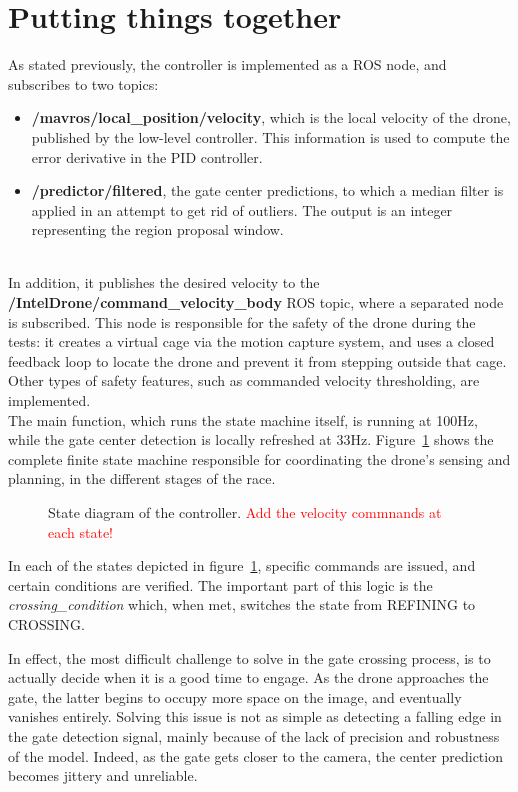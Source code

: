 \section{Putting things together}

As stated previously, the controller is implemented as a ROS node, and
subscribes to two topics:
\begin{itemize}
	\item{\textbf{/mavros/local\_position/velocity}, which is the local velocity
	of the drone, published by the low-level controller. This information is
	used to compute the error derivative in the PID controller.}
	\item{\textbf{/predictor/filtered}, the gate center predictions, to which a
	median filter is applied in an attempt to get rid of outliers. The output
	is an integer representing the region proposal window.}
\end{itemize}

~\\In addition, it publishes the desired velocity to the
\textbf{/IntelDrone/command\_velocity\_body} ROS topic, where a separated node
is subscribed. This node is responsible for the safety of the drone during the
tests: it creates a virtual cage via the motion capture system, and uses a
closed feedback loop to locate the drone and prevent it from stepping outside
that cage. Other types of safety features, such as commanded velocity
thresholding, are implemented.\\

The main function, which runs the state machine itself, is running at 100Hz,
while the gate center detection is locally refreshed at 33Hz.
Figure~\ref{fig:state} shows the complete finite state machine responsible for
coordinating the drone's sensing and planning, in the different stages of the
race.

\begin{figure}[h]
	\centering
	
	\caption{State diagram of the controller. \textcolor{red}{Add the velocity
	commnands at each state!}}
	\label{fig:state}
\end{figure}

In each of the states depicted in figure~\ref{fig:state}, specific commands are
issued, and certain conditions are verified. The important part of this logic
is the \emph{crossing\_condition} which, when met, switches the state from
REFINING to CROSSING.

In effect, the most difficult challenge to solve in the gate crossing process,
is to actually decide when it is a good time to engage. As the drone
approaches the gate, the latter begins to occupy more space on the image, and
eventually vanishes entirely. Solving this issue is not as simple as detecting
a falling edge in the gate detection signal, mainly because of the lack of
precision and robustness of the model. Indeed, as the gate gets closer to the
camera, the center prediction becomes jittery and unreliable.\\

